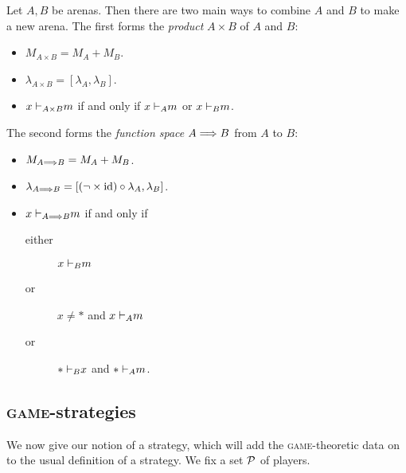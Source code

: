 \documentclass{article}
\newcommand{\game}{\textsc{game}}
\begin{document}
Let $A,B$ be arenas.  
Then there are two main ways to combine $A$ and $B$ to make a new arena.  
The first forms the \emph{product} $A\times B$ of $A$ and $B$:
\begin{itemize}
  \item $M_{A\times B} = M_A + M_B$.
  \item $\lambda_{A\times B} = [\lambda_A, \lambda_B]$.  
  \item $x\ts_{A\times B} m$ if and only if $x\ts_A m$ or $x\ts_B m$.
\end{itemize}
The second forms the \emph{function space} $A \iimpl B$ from $A$ to $B$:
\begin{itemize}
  \item $M_{A\iimpl B} = M_A + M_B$.
  \item $\lambda_{A\iimpl B} = [(\neg\times\id)\circ\lambda_A,\lambda_B]$.  
  \item $x\ts_{A\iimpl B} m$ if and only if
    \begin{description}
      \item[either] $x\ts_B m$
      \item[or] $x\ne *$ and $x\ts_A m$
      \item[or] $*\ts_B x$ and $*\ts_A m$.
    \end{description}
\end{itemize}

\subsection{\game{}-strategies}

We now give our notion of a strategy, which will add the \game{}-theoretic data on to the usual definition of a strategy.  
We fix a set $\P$ of players.
\end{document}
